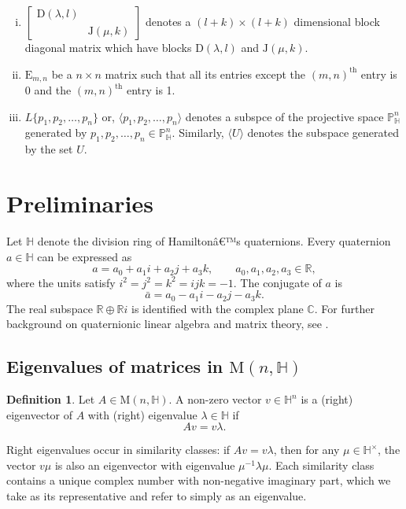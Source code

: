 \documentclass[12pt,reqno]{amsart}
\numberwithin{equation}{section}
\theoremstyle{definition}
\newtheorem{definition}[theorem]{Definition}
\def\H{\mathbb H}
\def\P{\mathbb P}
\def\H{\mathbb {H}}
\begin{document}
\begin{enumerate}[(i)]
		\item $\begin{bmatrix}
			\mathrm{D}(\lambda,l) & \\ & \mathrm{J}(\mu,k)
		\end{bmatrix}$ denotes a $(l+k)\times (l+k)$ dimensional block diagonal matrix which have blocks $\mathrm{D}(\lambda,l)$ and $\mathrm{J}(\mu,k)$.
		\item   $\mathrm{E}_{m,n}$ be a $n\times n$ matrix such that all its entries except the $(m,n)^{\text{th}}$ entry is 0 and the $(m,n)^{\text{th}}$ entry is 1.
		\item $L{\{p_1,p_2,\ldots,p_n\}}$ or, $\langle  p_1,p_2,\ldots,p_n \rangle $ denotes a subspce of the projective space $\P^{n}_\H$ generated by $p_1,p_2,\ldots,p_n\in \P^{n}_\H$. Similarly, $\langle U\rangle$ denotes the subspace generated by the set $U$.  
	\end{enumerate}
   \section{Preliminaries} \label{sec:prelim}
  Let $\mathbb{H}$ denote the division ring of Hamiltonâ€™s quaternions. Every quaternion $a \in \mathbb{H}$ can be expressed as
\[
a = a_0 + a_1 i + a_2 j + a_3 k, \qquad a_0,a_1,a_2,a_3 \in \mathbb{R},
\]
where the units satisfy $i^2 = j^2 = k^2 = ijk = -1$. The conjugate of $a$ is
\[
\bar{a} = a_0 - a_1 i - a_2 j - a_3 k.
\]
The real subspace $\mathbb{R}\oplus \mathbb{R}i$ is identified with the complex plane $\mathbb{C}$. For further background on quaternionic linear algebra and matrix theory, see \cite{rodman,FZ}.

\subsection*{Eigenvalues of matrices in  $\mathrm{M}(n,\mathbb{H})$}

\begin{definition}\label{def-eigen-M(n,H)-rew}
Let $A \in \mathrm{M}(n,\mathbb{H})$. A non-zero vector $v \in \mathbb{H}^n$ is a (right) eigenvector of $A$ with (right) eigenvalue $\lambda \in \mathbb{H}$ if
\[
A v = v \lambda.
\]
\end{definition}

Right eigenvalues occur in similarity classes: if $A v = v \lambda$, then for any $\mu \in \mathbb{H}^{\times}$, the vector $v\mu$ is also an eigenvector with eigenvalue $\mu^{-1}\lambda \mu$. Each similarity class contains a unique complex number with non-negative imaginary part, which we take as its representative and refer to simply as an eigenvalue.
\end{document}
